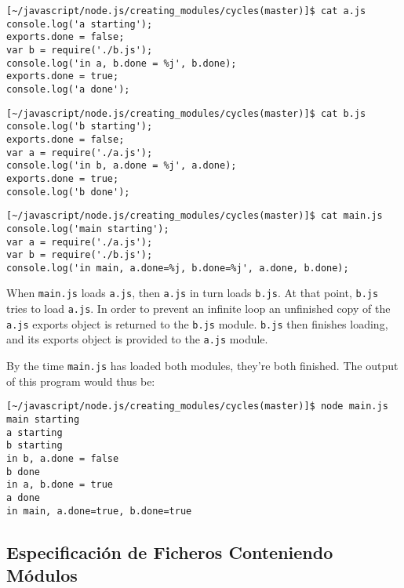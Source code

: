 \begin{verbatim}
[~/javascript/node.js/creating_modules/cycles(master)]$ cat a.js
console.log('a starting');
exports.done = false;
var b = require('./b.js');
console.log('in a, b.done = %j', b.done);
exports.done = true;
console.log('a done');
\end{verbatim}

\begin{verbatim}
[~/javascript/node.js/creating_modules/cycles(master)]$ cat b.js
console.log('b starting');
exports.done = false;
var a = require('./a.js');
console.log('in b, a.done = %j', a.done);
exports.done = true;
console.log('b done');
\end{verbatim}

\begin{verbatim}
[~/javascript/node.js/creating_modules/cycles(master)]$ cat main.js
console.log('main starting');
var a = require('./a.js');
var b = require('./b.js');
console.log('in main, a.done=%j, b.done=%j', a.done, b.done);
\end{verbatim}
When \verb|main.js| loads \verb|a.js|, then \verb|a.js| in turn loads
\verb|b.js|. At that point, \verb|b.js| tries to load \verb|a.js|. In
order to prevent an infinite loop an unfinished copy of the \verb|a.js|
exports object is returned to the \verb|b.js| module. \verb|b.js| then
finishes loading, and its exports object is provided to the \verb|a.js|
module.

By the time \verb|main.js| has loaded both modules, they're both finished. The
output of this program would thus be:

\begin{verbatim}
[~/javascript/node.js/creating_modules/cycles(master)]$ node main.js 
main starting
a starting
b starting
in b, a.done = false
b done
in a, b.done = true
a done
in main, a.done=true, b.done=true
\end{verbatim}

\subsection{Especificación de Ficheros Conteniendo Módulos}


